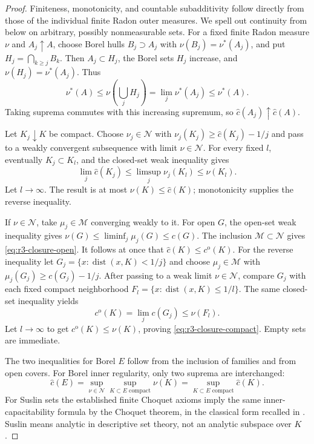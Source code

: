 \documentclass[11pt,a4paper]{article}
\numberwithin{equation}{section}
\theoremstyle{definition}
\theoremstyle{remark}
\begin{document}
\begin{proof}
Finiteness, monotonicity, and countable subadditivity follow directly
from those of the individual finite Radon outer measures.  We spell
out continuity from below on arbitrary, possibly nonmeasurable sets.
For a fixed finite Radon measure $\nu$ and $A_j\uparrow A$, choose
Borel hulls $B_j\supset A_j$ with $\nu(B_j)=\nu^*(A_j)$, and put
$H_j=\bigcap_{k\geq j}B_k$.  Then $A_j\subset H_j$, the Borel sets
$H_j$ increase, and $\nu(H_j)=\nu^*(A_j)$.  Thus
\[
 \nu^*(A)\leq\nu\!\left(\bigcup_jH_j\right)
             =\lim_j\nu^*(A_j)\leq\nu^*(A).
\]
Taking suprema commutes with this increasing supremum, so
$\widehat c(A_j)\uparrow\widehat c(A)$.

Let $K_j\downarrow K$ be compact.  Choose
$\nu_j\in\mathcal N$ with
$\nu_j(K_j)\geq\widehat c(K_j)-1/j$ and pass to a weakly convergent
subsequence with limit $\nu\in\mathcal N$.  For every fixed $l$,
eventually $K_j\subset K_l$, and the closed-set weak inequality gives
\[
 \lim_j\widehat c(K_j)\leq\limsup_j\nu_j(K_l)\leq\nu(K_l).
\]
Let $l\to\infty$.  The result is at most $\nu(K)\leq\widehat c(K)$;
monotonicity supplies the reverse inequality.

If $\nu\in\mathcal N$, take $\mu_j\in\mathcal M$ converging weakly
to it.  For open $G$, the open-set weak inequality gives
$\nu(G)\leq\liminf_j\mu_j(G)\leq c(G)$.  The inclusion
$\mathcal M\subset\mathcal N$ gives \eqref{eq:r3-closure-open}.
It follows at once that $\widehat c(K)\leq c^{\mathrm o}(K)$.
For the reverse inequality let
$G_j=\{x:\operatorname{dist}(x,K)<1/j\}$ and choose
$\mu_j\in\mathcal M$ with $\mu_j(G_j)\geq c(G_j)-1/j$.
After passing to a weak limit $\nu\in\mathcal N$, compare $G_j$
with each fixed compact neighborhood
$F_l=\{x:\operatorname{dist}(x,K)\leq1/l\}$.  The same closed-set
inequality yields
\[
 c^{\mathrm o}(K)=\lim_jc(G_j)\leq\nu(F_l).
\]
Let $l\to\infty$ to get $c^{\mathrm o}(K)\leq\nu(K)$, proving
\eqref{eq:r3-closure-compact}.  Empty sets are immediate.

The two inequalities for Borel $E$ follow from the inclusion of
families and from open covers.  For Borel inner regularity, only
two suprema are interchanged:
\[
 \widehat c(E)
 =\sup_{\nu\in\mathcal N}\sup_{K\subset E\text{ compact}}\nu(K)
 =\sup_{K\subset E\text{ compact}}\widehat c(K).
\]
For Suslin sets the established finite Choquet axioms imply the
same inner-capacitability formula by the Choquet theorem, in the
classical form recalled in \cite[\S8]{BT82}.  Suslin means analytic
in descriptive set theory, not an analytic subspace over $K$.
\end{proof}
\end{document}

